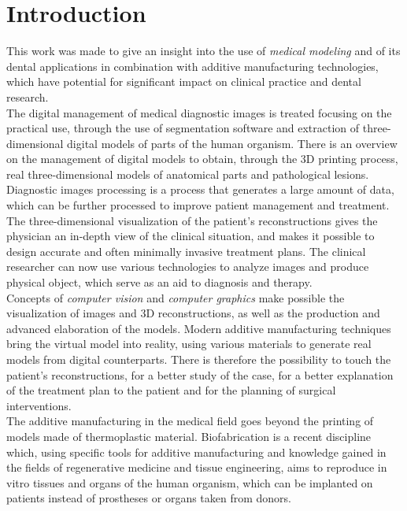 
\chapter{Introduction} %

\label{Introduzione} %
 
 
 
This work was made to give an insight into the use of \emph{medical modeling} and of its dental applications in combination with additive manufacturing technologies, which have potential for significant impact on clinical practice and dental research.\\
The digital management of medical diagnostic images is treated focusing on the practical use, through the use of segmentation software and extraction of three-dimensional digital models of parts of the human organism. There is an overview on the management of digital models to obtain, through the 3D printing process, real three-dimensional models of anatomical parts and pathological lesions.\\
Diagnostic images processing is a process that generates a large amount of data, which can be further processed to improve patient management and treatment. The three-dimensional visualization of the patient's reconstructions gives the physician an in-depth view of the clinical situation, and makes it possible to design accurate and often minimally invasive treatment plans. The clinical researcher can now use various technologies to analyze images and produce physical object, which serve as an aid to diagnosis and therapy.\\
Concepts of \emph{computer vision} and \emph{computer graphics} make possible the visualization of images and 3D reconstructions, as well as the production and advanced elaboration of the models. Modern additive manufacturing techniques bring the virtual model into reality, using various materials to generate real models from digital counterparts. There is therefore the possibility to touch the patient's reconstructions, for a better study of the case, for a better explanation of the treatment plan to the patient and for the planning of surgical interventions.\\
The additive manufacturing in the medical field goes beyond the printing of models made of thermoplastic material. Biofabrication is a recent discipline which, using specific tools for additive manufacturing and knowledge gained in the fields of regenerative medicine and tissue engineering, aims to reproduce in vitro tissues and organs of the human organism, which can be implanted on patients instead of prostheses or organs taken from donors. \\
